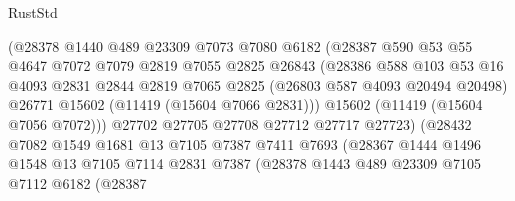 \begin{lexlean}{RustStd}
\begin{coremodule}
                            (@28378
                              @1440
                              @489
                              @23309
                              @7073
                              @7080
                              @6182
                              (@28387
                                @590
                                @53
                                @55
                                @4647
                                @7072
                                @7079
                                @2819
                                @7055
                                @2825
                                @26843
                                (@28386
                                  @588
                                  @103
                                  @53
                                  @16
                                  @4093
                                  @2831
                                  @2844
                                  @2819
                                  @7065
                                  @2825
                                  (@26803 @587 @4093 @20494 @20498)
                                  @26771
                                  @15602
                                  (@11419 (@15604 @7066 @2831)))
                                @15602
                                (@11419 (@15604 @7056 @7072)))
                              @27702
                              @27705
                              @27708
                              @27712
                              @27717
                              @27723)
                            (@28432
                              @7082
                              @1549
                              @1681
                              @13
                              @7105
                              @7387
                              @7411
                              @7693
                              (@28367
                                @1444
                                @1496
                                @1548
                                @13
                                @7105
                                @7114
                                @2831
                                @7387
                                (@28378
                                  @1443
                                  @489
                                  @23309
                                  @7105
                                  @7112
                                  @6182
                                  (@28387

\end{coremodule}
\end{lexlean}
